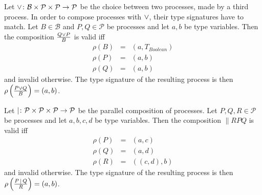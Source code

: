 \begin{definition}
\label{def:static_choice}
Let $\choiceop \colon \mathcal{B} \times \mathcal{P} \times \mathcal{P} \to \mathcal{P}$ be the choice between two processes, made by a third process. In order to compose processes with $\choiceop$, their type signatures have to match. Let $B \in \mathcal{B}$ and $P, Q \in \mathcal{P}$ be processes and let $a, b$ be type variables. Then the composition $\choice{B}{Q}{P}$ is valid iff
\begin{eqnarray*}
  \rho \left( B \right) & = & \left( a, T_{Boolean} \right) \\
  \rho \left( P \right) & = & \left( a, b \right) \\
  \rho \left( Q \right) & = & \left( a, b \right)
\end{eqnarray*}
and invalid otherwise. The type signature of the resulting process is then $\typesignature{\choice{B}{P}{Q}}{a}{b}$.

\hfill\qedsymbol
\end{definition}


\begin{definition}
Let $\parallelop \colon \mathcal{P} \times \mathcal{P} \times \mathcal{P} \to \mathcal{P}$ be the parallel composition of processes. Let $P, Q, R \in \mathcal{P}$ be processes and let $a, b, c, d$ be type variables. Then the composition $\parallel{R}{P}{Q}$ is valid iff
\begin{eqnarray*}
  \rho \left( P \right) & = & \left( a, c \right) \\
  \rho \left( Q \right) & = & \left( a, d \right) \\
  \rho \left( R \right) & = & \left( \left( c, d \right), b \right)
\end{eqnarray*}
and invalid otherwise. The type signature of the resulting process is then $\typesignature{\parallel{R}{P}{Q}}{a}{b}$.

\hfill\qedsymbol
\end{definition}


